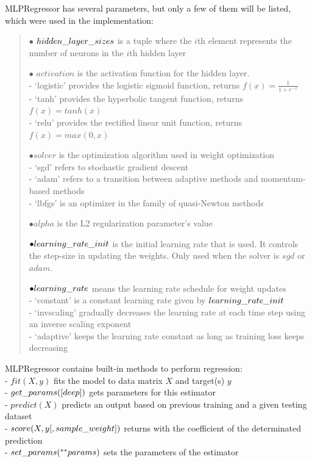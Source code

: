 \noindent MLPRegressor has several parameters, but only a few of them will be listed, which were used in the implementation:
\begin{verse}
	$\bullet$ $hidden\char`_layer\char`_sizes$ is a tuple where the $i$th element represents the number of neurons in the $i$th hidden layer
	
	$\bullet$ $activation$ is the activation function for the hidden layer.\\
	\hspace{11pt} - ‘logistic’ provides the logistic sigmoid function, returns $f(x) = \frac{1}{1 + e^{-x}}$\\
	\hspace{8pt} - ‘tanh’ provides the hyperbolic tangent function, returns $f(x) = tanh(x)$\\
	\hspace{8pt} - ‘relu’ provides the rectified linear unit function, returns $f(x) = max(0, x)$ 
	
	$\bullet solver$ is the optimization algorithm used in weight optimization\\
	\hspace{9pt} - ‘sgd’ refers to stochastic gradient descent\\
	\hspace{10pt} - ‘adam’ refers to a transition between adaptive methods and momentum-based methods\\
	\hspace{10pt} - ‘lbfgs’ is an optimizer in the family of quasi-Newton methods
	
	$\bullet alpha$ is the L2 regularization parameter's value
	
	$\bullet learning\char`_rate\char`_init$ is the initial learning rate that is used. It controls the step-size in updating the weights. Only used when the solver is $sgd$ or $adam$.
	
	$\bullet learning\char`_rate$ means the learning rate schedule for weight updates \\
	\hspace{10pt} - ‘constant’ is a constant learning rate given by $learning\char`_rate\char`_init$\\
	\hspace{10pt} - ‘invscaling’ gradually decreases the learning rate at each time step using an inverse scaling exponent\\
	\hspace{10pt} - ‘adaptive’ keeps the learning rate constant as long as training loss keeps decreasing
\end{verse}
MLPRegressor contains built-in methods to perform regression:\\
- $fit(X, y)$ fits the model to data matrix $X$ and target(s) $y$\\
- $get\char`_params([deep])$ gets parameters for this estimator\\
- $predict(X)$ predicts an output based on previous training and a given testing dataset\\
- $score(X, y[, sample\char`_weight])$ returns with the coefficient of the determinated prediction\\
- $set\char`_params(^{**} params)$ sets the parameters of the estimator

